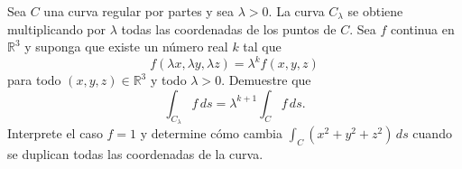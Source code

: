 Sea $C$ una curva regular por partes y sea $\lambda>0$. La curva $C_\lambda$ se obtiene multiplicando por $\lambda$ todas las coordenadas de los puntos de $C$. Sea $f$ continua en $\mathbb R^3$ y suponga que existe un número real $k$ tal que
\[
f(\lambda x,\lambda y,\lambda z)=\lambda^k f(x,y,z)
\]
para todo $(x,y,z)\in\mathbb R^3$ y todo $\lambda>0$. Demuestre que
\[
\int_{C_\lambda} f\,ds=\lambda^{k+1}\int_C f\,ds.
\]
Interprete el caso $f=1$ y determine cómo cambia $\int_C(x^2+y^2+z^2)\,ds$ cuando se duplican todas las coordenadas de la curva.
